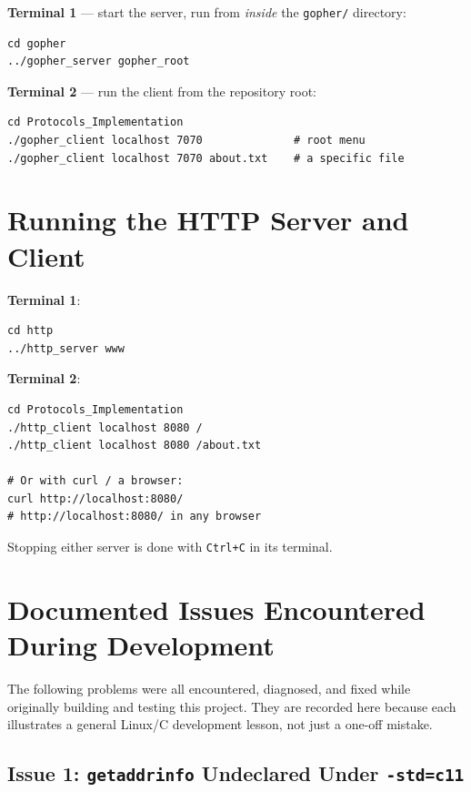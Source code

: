 \textbf{Terminal 1} --- start the server, run from \emph{inside} the \texttt{gopher/} directory:
\begin{lstlisting}[style=bashstyle, numbers=none]
cd gopher
../gopher_server gopher_root
\end{lstlisting}

\textbf{Terminal 2} --- run the client from the repository root:
\begin{lstlisting}[style=bashstyle, numbers=none]
cd Protocols_Implementation
./gopher_client localhost 7070              # root menu
./gopher_client localhost 7070 about.txt    # a specific file
\end{lstlisting}

\section{Running the HTTP Server and Client}

\textbf{Terminal 1}:
\begin{lstlisting}[style=bashstyle, numbers=none]
cd http
../http_server www
\end{lstlisting}

\textbf{Terminal 2}:
\begin{lstlisting}[style=bashstyle, numbers=none]
cd Protocols_Implementation
./http_client localhost 8080 /
./http_client localhost 8080 /about.txt

# Or with curl / a browser:
curl http://localhost:8080/
# http://localhost:8080/ in any browser
\end{lstlisting}

Stopping either server is done with \texttt{Ctrl+C} in its terminal.

\section{Documented Issues Encountered During Development}
\label{sec:documented-issues}

The following problems were all encountered, diagnosed, and fixed while originally building and testing this project. They are recorded here because each illustrates a general Linux/C development lesson, not just a one-off mistake.

\subsection{Issue 1: \texttt{getaddrinfo} Undeclared Under \texttt{-std=c11}}

